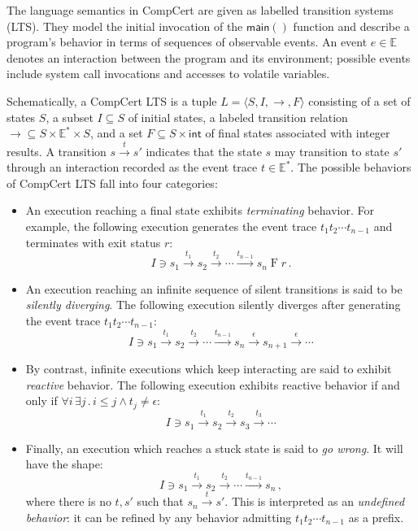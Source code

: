 \documentclass[sigplan,10pt,review,anonymous]{acmart}
\newcommand{\kw}[1]{\ensuremath{ \mathsf{#1} }}
\begin{document}
The language semantics in CompCert are
given as labelled transition systems (LTS).
They model the initial invocation of the \kw{main()} function
and describe a program's behavior in terms of
sequences of observable events.
An event $e \in \mathbb{E}$ denotes an interaction between
the program and its environment;
possible events include system call invocations
and accesses to volatile variables.

Schematically, a CompCert LTS
is a tuple
$L = \langle S, I, {\rightarrow}, F \rangle$
consisting of
a set of states $S$,
a subset $I \subseteq S$ of initial states,
a labeled transition relation
${\rightarrow} \subseteq S \times \mathbb{E}^* \times S$,
and a set
$F \subseteq S \times \kw{int}$
of final states associated with integer results.
A transition $s \stackrel{t}{\rightarrow} s'$
indicates that the state $s$ may transition to state $s'$
through an interaction recorded as the event trace $t \in \mathbb{E}^*$.
The possible behaviors of CompCert LTS fall into four categories:
\begin{itemize}
\item An execution reaching a final state exhibits
    \emph{terminating} behavior.
    For example,
    the following execution generates
    the event trace $t_1 t_2 \cdots t_{n-1}$
    and terminates with exit status $r$:
    \[
        I \ni s_1 \stackrel{t_1}{\rightarrow}
          s_2 \stackrel{t_2}{\rightarrow}
          \cdots \stackrel{t_{n-1}}{\rightarrow}
          s_n \mathrel{F} r \,.
    \]
\item An execution reaching
    an infinite sequence of silent transitions
    is said to be \emph{silently diverging}.
    The following execution silently diverges after
    generating the event trace $t_1 t_2 \cdots t_{n-1}$:
    \[
        I \ni s_1 \stackrel{t_1}{\rightarrow}
          s_2 \stackrel{t_2}{\rightarrow}
          \cdots \stackrel{t_{n-1}}{\rightarrow}
          s_n \stackrel{\epsilon}{\rightarrow}
          s_{n+1} \stackrel{\epsilon}{\rightarrow}
          \cdots
    \]
\item By contrast,
    infinite executions which keep interacting
    are said to exhibit \emph{reactive} behavior.
    The following execution
    exhibits reactive behavior if and only if
    $\forall i \, \exists j \,.\, i \le j \wedge t_j \ne \epsilon$:
    \[
        I \ni s_1 \stackrel{t_1}{\rightarrow}
          s_2 \stackrel{t_2}{\rightarrow}
          s_3 \stackrel{t_3}{\rightarrow}
          \cdots
    \]
\item Finally, an execution which reaches a stuck state
    is said to \emph{go wrong}. It will have the shape:
    \[
        I \ni s_1 \stackrel{t_1}{\rightarrow}
          s_2 \stackrel{t_2}{\rightarrow}
          \cdots \stackrel{t_{n-1}}{\rightarrow}
          s_n \,,
    \]
    where there is no $t, s'$ such that
    $s_n \stackrel{t}{\rightarrow} s'$.
    This is interpreted as an \emph{undefined behavior}:
    it can be refined by any behavior
    admitting $t_1 t_2 \cdots t_{n-1}$ as a prefix.
\end{itemize}
\end{document}
